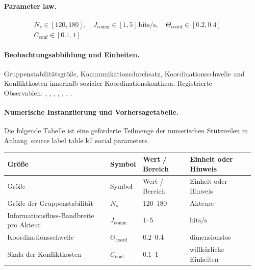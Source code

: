 \paragraph{Parameter law.}
\[
\begin{gathered} N_s \in [120,180],\quad J_{\mathrm{comm}} \in [1,5]\,\mathrm{bits/s},\quad \Theta_{\mathrm{coord}} \in [0.2,0.4] \\ C_{\mathrm{conf}} \in [0.1,1] \end{gathered}
\]

\paragraph{Beobachtungsabbildung und Einheiten.}
Gruppenstabilitätsgröße, Kommunikationsdurchsatz, Koordinationsschwelle und Konfliktkosten innerhalb sozialer Koordinationskontinua.
Registrierte Observablen: , \allowbreak {}, \allowbreak {}, \allowbreak {}, \allowbreak {}, \allowbreak {}, \allowbreak {}.

\paragraph{Numerische Instanziierung und Vorhersagetabelle.}
Die folgende Tabelle ist eine geförderte Teilmenge der numerischen Stützzeilen in Anhang~source label table k7 social parameters.
\begin{longtable}{@{}L{0.27\textwidth}L{0.15\textwidth}L{0.24\textwidth}L{0.16\textwidth}@{}}
\toprule
Größe & Symbol & Wert / Bereich & Einheit oder Hinweis \\
\midrule
\endfirsthead
\toprule
Größe & Symbol & Wert / Bereich & Einheit oder Hinweis \\
\midrule
\endhead
Größe der Gruppenstabilität & $\scriptstyle N_s$ & $120\text{--}180$ & Akteure \\
Informationsfluss-Bandbreite pro Akteur & $\scriptstyle J_{\mathrm{comm}}$ & $1\text{--}5$ & $\mathrm{bits/s}$ \\
Koordinationsschwelle & $\scriptstyle \Theta_{\mathrm{coord}}$ & $0.2\text{--}0.4$ & dimensionslos \\
Skala der Konfliktkosten & $\scriptstyle C_{\mathrm{conf}}$ & $0.1\text{--}1$ & willkürliche Einheiten \\
\bottomrule
\end{longtable}

